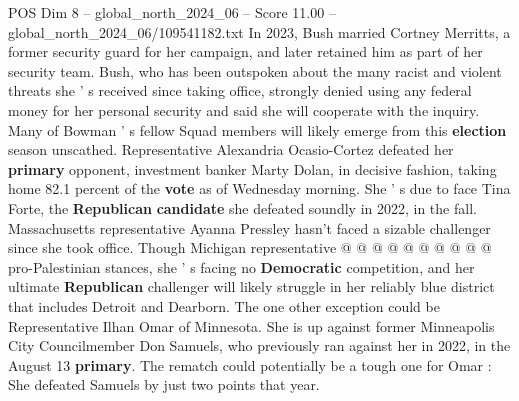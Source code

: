 \begin{textsample}{POS Dim 8 – global\_north\_2024\_06 – Score 11.00 – global\_north\_2024\_06/109541182.txt}
In 2023, Bush married Cortney Merritts, a former security guard for her campaign, and later retained him as part of her security team.
Bush, who has been outspoken about the many racist and violent threats she ' s received since taking office, strongly denied using any federal money for her personal security and said she will cooperate with the inquiry.
Many of Bowman ' s fellow Squad members will likely emerge from this \textbf{election} season unscathed.
Representative Alexandria Ocasio-Cortez defeated her \textbf{primary} opponent, investment banker Marty Dolan, in decisive fashion, taking home 82.1 percent of the \textbf{vote} as of Wednesday morning.
She ' s due to face Tina Forte, the \textbf{Republican} \textbf{candidate} she defeated soundly in 2022, in the fall.
Massachusetts representative Ayanna Pressley hasn't faced a sizable challenger since she took office.
Though Michigan representative @ @ @ @ @ @ @ @ @ @ pro-Palestinian stances, she ' s facing no \textbf{Democratic} competition, and her ultimate \textbf{Republican} challenger will likely struggle in her reliably blue district that includes Detroit and Dearborn.
The one other exception could be Representative Ilhan Omar of Minnesota.
She is up against former Minneapolis City Councilmember Don Samuels, who previously ran against her in 2022, in the August 13 \textbf{primary}.
The rematch could potentially be a tough one for Omar : She defeated Samuels by just two points that year.

\end{textsample}

